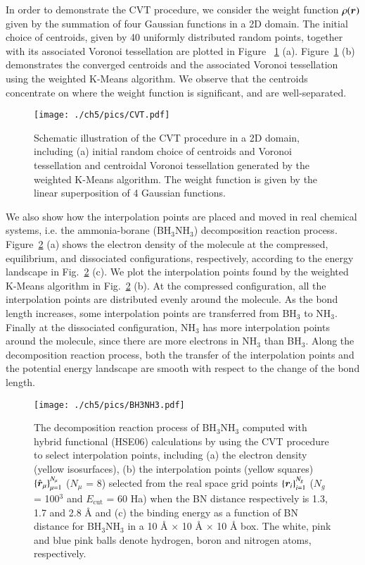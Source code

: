 In order to demonstrate the CVT procedure, we consider the weight function $\rho
(\bm{r})$ given by the summation of four Gaussian functions in a 2D domain. The
initial choice of centroids, given by 40 uniformly distributed random points,
together with its associated Voronoi tessellation are plotted in Figure~
\ref{fig:CVT} (a). Figure~\ref{fig:CVT} (b) demonstrates the converged centroids
and the associated Voronoi tessellation using the weighted K-Means algorithm. We
observe that the centroids concentrate on where the weight function is
significant, and are well-separated.

\begin{figure}[htbp]
  \begin{center}
    \texttt{[image: ./ch5/pics/CVT.pdf]}
  \end{center}
  \caption{Schematic illustration of the CVT procedure in a 2D domain, including
  (a) initial random choice of centroids and Voronoi tessellation and centroidal
  Voronoi tessellation generated by the weighted K-Means algorithm. The weight
  function is given by  the linear superposition of 4 Gaussian functions.}
  \label{fig:CVT}
\end{figure}

We also show how the interpolation points are placed and moved in real chemical
systems, i.e. the ammonia-borane (BH$_3$NH$_3$) decomposition reaction process.
Figure~\ref{fig:BH3NH3} (a) shows the electron density of the molecule at the
compressed, equilibrium, and dissociated configurations, respectively, according
to the energy landscape in Fig.~\ref{fig:BH3NH3} (c). We plot the interpolation
points found by the weighted K-Means algorithm in Fig.~\ref{fig:BH3NH3} (b). At
the compressed configuration, all the interpolation points are distributed
evenly around the molecule. As the bond length increases, some interpolation
points are transferred from BH$_3$ to NH$_3$. Finally at the dissociated
configuration, NH$_3$ has more interpolation points around the molecule, since
there are more electrons in NH$_3$ than BH$_3$. Along the decomposition reaction
process, both the transfer of the interpolation points and the potential energy
landscape are smooth with respect to the change of the bond length.


\begin{figure}[htbp]
  \begin{center}
    \texttt{[image: ./ch5/pics/BH3NH3.pdf]}
  \end{center}
  \caption{The decomposition reaction process of BH$_3$NH$_3$ computed with
  hybrid functional (HSE06) calculations by using the CVT procedure to select
  interpolation points, including (a) the electron density (yellow isosurfaces),
  (b) the interpolation points (yellow squares) $\{\smash{\hat{\bm{r}}}_\mu\}_{\mu=1}^{N_
  {\mu}}$ ($N_{\mu}$ = 8) selected from the real space grid points $\{\bm{r}_{i}\}_
  {i=1}^{N_{g}}$ ($N_{g}$ = 100$^3$ and $E_{\text{cut}}$ = 60 Ha) when the BN
  distance respectively is 1.3, 1.7 and 2.8 {\AA} and (c) the binding energy as
  a function of BN distance for BH$_3$NH$_3$ in a 10 {\AA} $\times$ 10 {\AA}
  $\times$ 10 {\AA} box. The white, pink and blue pink balls denote hydrogen,
  boron and nitrogen atoms, respectively.}
  \label{fig:BH3NH3}
\end{figure}